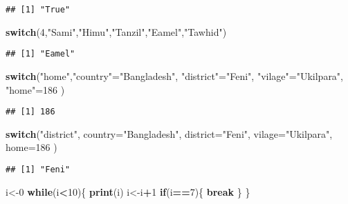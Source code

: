 \documentclass[
]{article}
\newenvironment{Shaded}{\begin{snugshade}}{\end{snugshade}}
\newcommand{\AttributeTok}[1]{\textcolor[rgb]{0.13,0.29,0.53}{#1}}
\newcommand{\ControlFlowTok}[1]{\textcolor[rgb]{0.13,0.29,0.53}{\textbf{#1}}}
\newcommand{\DecValTok}[1]{\textcolor[rgb]{0.00,0.00,0.81}{#1}}
\newcommand{\FunctionTok}[1]{\textcolor[rgb]{0.13,0.29,0.53}{\textbf{#1}}}
\newcommand{\NormalTok}[1]{#1}
\newcommand{\OtherTok}[1]{\textcolor[rgb]{0.56,0.35,0.01}{#1}}
\newcommand{\SpecialCharTok}[1]{\textcolor[rgb]{0.81,0.36,0.00}{\textbf{#1}}}
\newcommand{\StringTok}[1]{\textcolor[rgb]{0.31,0.60,0.02}{#1}}
\begin{document}
\begin{verbatim}
## [1] "True"
\end{verbatim}

\begin{Shaded}
\begin{Highlighting}[]
\ControlFlowTok{switch}\NormalTok{(}\DecValTok{4}\NormalTok{,}\StringTok{"Sami"}\NormalTok{,}\StringTok{"Himu"}\NormalTok{,}\StringTok{"Tanzil"}\NormalTok{,}\StringTok{"Eamel"}\NormalTok{,}\StringTok{"Tawhid"}\NormalTok{)}
\end{Highlighting}
\end{Shaded}

\begin{verbatim}
## [1] "Eamel"
\end{verbatim}

\begin{Shaded}
\begin{Highlighting}[]
\ControlFlowTok{switch}\NormalTok{(}\StringTok{"home"}\NormalTok{,}\StringTok{"country"}\OtherTok{=}\StringTok{"Bangladesh"}\NormalTok{, }\StringTok{"district"}\OtherTok{=}\StringTok{"Feni"}\NormalTok{, }\StringTok{"vilage"}\OtherTok{=}\StringTok{"Ukilpara"}\NormalTok{, }\StringTok{"home"}\OtherTok{=}\DecValTok{186}\NormalTok{ )}
\end{Highlighting}
\end{Shaded}

\begin{verbatim}
## [1] 186
\end{verbatim}

\begin{Shaded}
\begin{Highlighting}[]
\ControlFlowTok{switch}\NormalTok{(}\StringTok{"district"}\NormalTok{,}
       \AttributeTok{country=}\StringTok{"Bangladesh"}\NormalTok{, }
       \AttributeTok{district=}\StringTok{"Feni"}\NormalTok{, }
       \AttributeTok{vilage=}\StringTok{"Ukilpara"}\NormalTok{, }
       \AttributeTok{home=}\DecValTok{186}\NormalTok{ )}
\end{Highlighting}
\end{Shaded}

\begin{verbatim}
## [1] "Feni"
\end{verbatim}

\begin{Shaded}
\begin{Highlighting}[]
\NormalTok{i}\OtherTok{\textless{}{-}}\DecValTok{0}
\ControlFlowTok{while}\NormalTok{(i}\SpecialCharTok{\textless{}}\DecValTok{10}\NormalTok{)\{}
    \FunctionTok{print}\NormalTok{(i)}
\NormalTok{    i}\OtherTok{\textless{}{-}}\NormalTok{i}\SpecialCharTok{+}\DecValTok{1}
    \ControlFlowTok{if}\NormalTok{(i}\SpecialCharTok{==}\DecValTok{7}\NormalTok{)\{}
        \ControlFlowTok{break}
\NormalTok{    \}}
\NormalTok{\}}
\end{Highlighting}
\end{Shaded}
\end{document}
